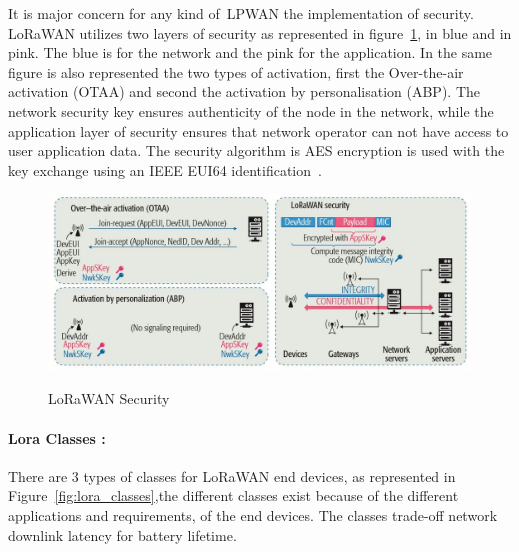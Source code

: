 It is major concern for any kind of~\gls{LPWAN} the implementation of security. LoRaWAN utilizes two layers of security as represented in figure~\ref{fig:lora_security}, in blue and in pink. The blue is for the network and the pink for the application. In the same figure is also represented the two types of activation, first the Over-the-air activation (OTAA) and second the activation by personalisation (ABP).
The network security key ensures authenticity of the node in the network, while the application layer of security ensures that network operator can not have access to user application data. The security algorithm is AES encryption is used with the key exchange using an IEEE EUI64 identification~\cite{Navarro-Ortiz2018}. \newline\newline\newline\newline
 
\begin{figure}[ht]
  \centering
    {\includegraphics[height=2.1 in,width=0.75\linewidth]{Chapters/Figures/LoRaSecurity.JPG}}%
  \caption{LoRaWAN Security~\cite{Navarro-Ortiz2018}}
  \label{fig:lora_security}
\end{figure}



\paragraph{Lora Classes :}
\label{par: lora_classes_sota}


There are 3 types of classes for LoRaWAN end devices, as represented in Figure~\ref{fig:lora_classes},the different classes exist because of the different applications and requirements, of the end devices. The classes trade-off network downlink latency for battery lifetime. 

